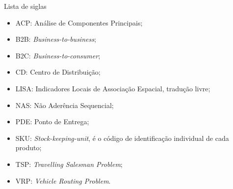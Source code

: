 \documentclass[espacoumemeio, times, 12pt, pnumromarab, abnttoc, normalnum]{politex}
\begin{document}
\capa 
\falsafolhaderosto
\folhaderosto





\listadefiguras
\listadetabelas
\lstlistoflistings

\begin{pretextualsection}{Lista de siglas}

\begin{itemize}
    \item ACP: Análise de Componentes Principais;
    \item B2B: \textit{Business-to-business};
    \item B2C: \textit{Business-to-consumer};
    \item CD: Centro de Distribuição;
    \item LISA: Indicadores Locais de Associação Espacial, tradução livre;
    \item NAS: Não Aderência Sequencial;
    \item PDE: Ponto de Entrega;
    \item SKU: \textit{Stock-keeping-unit}, é o código de identificação individual de cada produto;
    \item TSP: \textit{Travelling Salesman Problem};
    \item VRP: \textit{Vehicle Routing Problem}.
\end{itemize}

\end{pretextualsection}

\sumario





















\apendice

\end{document}
